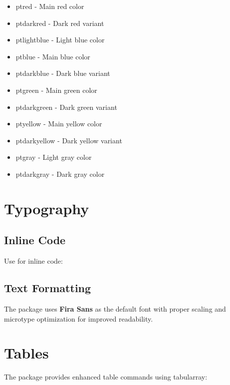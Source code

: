 \documentclass[11pt,letterpaper]{article}
\begin{document}
\begin{itemize}
    \item \textcolor{ptred}{ptred} - Main red color
    \item \textcolor{ptdarkred}{ptdarkred} - Dark red variant
    \item \textcolor{ptlightblue}{ptlightblue} - Light blue color
    \item \textcolor{ptblue}{ptblue} - Main blue color
    \item \textcolor{ptdarkblue}{ptdarkblue} - Dark blue variant
    \item \textcolor{ptgreen}{ptgreen} - Main green color
    \item \textcolor{ptdarkgreen}{ptdarkgreen} - Dark green variant
    \item \textcolor{ptyellow}{ptyellow} - Main yellow color
    \item \textcolor{ptdarkyellow}{ptdarkyellow} - Dark yellow variant
    \item \textcolor{ptgray}{ptgray} - Light gray color
    \item \textcolor{ptdarkgray}{ptdarkgray} - Dark gray color
\end{itemize}

\section{Typography}

\subsection{Inline Code}

Use  for inline code: 

\subsection{Text Formatting}

The package uses \textbf{Fira Sans} as the default font with proper scaling and microtype optimization for improved readability.

\section{Tables}

The package provides enhanced table commands using tabularray:
\end{document}
